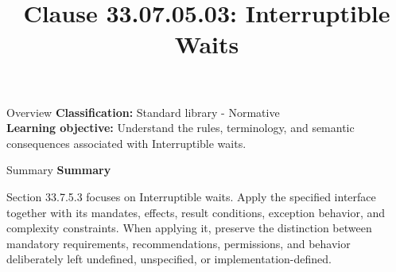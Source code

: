\documentclass[10pt,letterpaper]{article}
\title{Clause 33.07.05.03: Interruptible Waits}
\author{}
\date{}
\begin{document}
\maketitle
\begin{CornellOverviewBox}{Overview}
\textbf{Classification:} Standard library - Normative\\[2pt]
\textbf{Learning objective:} Understand the rules, terminology, and semantic consequences associated with Interruptible waits.
\end{CornellOverviewBox}\begin{CornellSummaryBox}{Summary}
{\sffamily\bfseries\color{Accent} Summary}\par\vspace{3pt}Section 33.7.5.3 focuses on Interruptible waits. Apply the specified interface together with its mandates, effects, result conditions, exception behavior, and complexity constraints. When applying it, preserve the distinction between mandatory requirements, recommendations, permissions, and behavior deliberately left undefined, unspecified, or implementation-defined.
\end{CornellSummaryBox}
\end{document}
